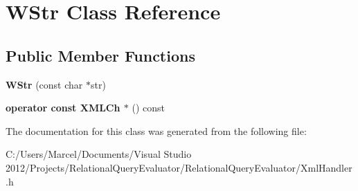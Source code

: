 \hypertarget{class_w_str}{\section{W\+Str Class Reference}
\label{class_w_str}
}
\subsection*{Public Member Functions}
\begin{DoxyCompactItemize}
\item 
\hypertarget{class_w_str_a0f1f21c92549b4a1b421d956f22c9325}{{\bfseries W\+Str} (const char $\ast$str)}\label{class_w_str_a0f1f21c92549b4a1b421d956f22c9325}

\item 
\hypertarget{class_w_str_a15ed335f1d00ecb39034db4d9d53acad}{{\bfseries operator const X\+M\+L\+Ch $\ast$} () const }\label{class_w_str_a15ed335f1d00ecb39034db4d9d53acad}

\end{DoxyCompactItemize}


The documentation for this class was generated from the following file\+:\begin{DoxyCompactItemize}
\item 
C\+:/\+Users/\+Marcel/\+Documents/\+Visual Studio 2012/\+Projects/\+Relational\+Query\+Evaluator/\+Relational\+Query\+Evaluator/Xml\+Handler.\+h\end{DoxyCompactItemize}
